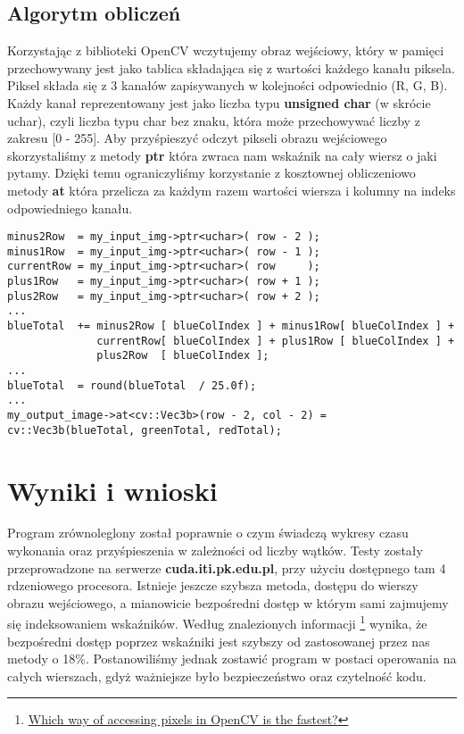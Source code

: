 \documentclass[a4paper,12pt]{article}
\begin{document}
\subsection*{Algorytm obliczeń}

	Korzystając z biblioteki OpenCV wczytujemy obraz wejściowy, który w pamięci przechowywany jest jako tablica składająca się z wartości każdego kanału piksela.
	 Piksel składa się z 3 kanałów zapisywanych w kolejności odpowiednio (R, G, B).
Każdy kanał reprezentowany jest jako liczba typu \textbf{unsigned char} (w skrócie uchar), czyli liczba typu char bez znaku, która 		     może przechowywać liczby z zakresu [0 - 255]. 
Aby przyśpieszyć odczyt pikseli obrazu wejściowego skorzystaliśmy z metody \textbf{ptr} która zwraca nam wskaźnik na cały wiersz o jaki pytamy. 
Dzięki temu ograniczyliśmy korzystanie z kosztownej obliczeniowo metody \textbf{at} która przelicza za każdym razem wartości wiersza i kolumny na indeks odpowiedniego kanału.

\clearpage
\begin{lstlisting}[caption=Fragment wewnętrznej pętli iterującej po wierszach.=Row pointery]
minus2Row  = my_input_img->ptr<uchar>( row - 2 );
minus1Row  = my_input_img->ptr<uchar>( row - 1 );
currentRow = my_input_img->ptr<uchar>( row     );
plus1Row   = my_input_img->ptr<uchar>( row + 1 );
plus2Row   = my_input_img->ptr<uchar>( row + 2 );
...    
blueTotal  += minus2Row [ blueColIndex ] + minus1Row[ blueColIndex ] +
              currentRow[ blueColIndex ] + plus1Row [ blueColIndex ] +
              plus2Row  [ blueColIndex ];        
...
blueTotal  = round(blueTotal  / 25.0f);
...
my_output_image->at<cv::Vec3b>(row - 2, col - 2) = cv::Vec3b(blueTotal, greenTotal, redTotal);
\end{lstlisting}

\section*{Wyniki i wnioski}

Program zrównoleglony został poprawnie o czym świadczą wykresy czasu wykonania oraz przyśpieszenia w zależności od liczby wątków.
Testy zostały przeprowadzone na serwerze \textbf{cuda.iti.pk.edu.pl}, przy użyciu dostępnego tam 4 rdzeniowego procesora.
Istnieje jeszcze szybsza metoda, dostępu do wierszy obrazu wejściowego, a mianowicie bezpośredni dostęp w którym sami zajmujemy się indeksowaniem wskaźników. Według znalezionych informacji 
\footnote{\href{http://longstryder.com/2014/07/which-way-of-accessing-pixels-in-opencv-is-the-fastest/}
{Which way of accessing pixels in OpenCV is the fastest?}} wynika, że bezpośredni dostęp poprzez wskaźniki jest szybszy od zastosowanej przez nas metody o 18\%. Postanowiliśmy jednak zostawić program w postaci operowania na całych wierszach, gdyż ważniejsze było bezpieczeństwo oraz czytelność kodu.
\end{document}
